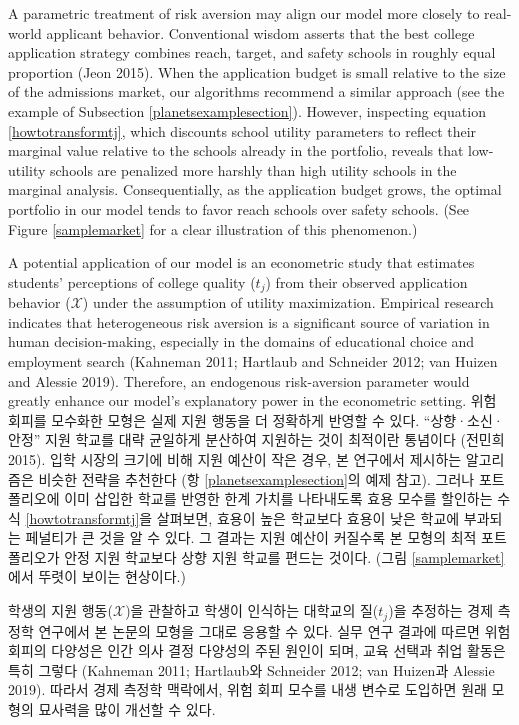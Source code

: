 \documentclass[11pt]{article} %
\theoremstyle{definition}
\theoremstyle{definition}
\begin{document}
\ifen
A parametric treatment of risk aversion may align our model more closely to real-world applicant behavior. Conventional wisdom asserts that the best college application strategy combines reach, target, and safety schools in roughly equal proportion (Jeon 2015). When the application budget is small relative to the size of the admissions market, our algorithms recommend a similar approach (see the example of Subsection \ref{planetsexamplesection}). However, inspecting equation \eqref{howtotransformtj}, which discounts school utility parameters to reflect their marginal value relative to the schools already in the portfolio, reveals that low-utility schools are penalized more harshly than high utility schools in the marginal analysis. Consequentially, as the application budget grows, the optimal portfolio in our model tends to favor reach schools over safety schools. (See Figure \ref{samplemarket} for a clear illustration of this phenomenon.) 
 
A potential application of our model is an econometric study that estimates students’ perceptions of college quality ($t_j$) from their observed application behavior ($\mathcal{X}$) under the assumption of utility maximization. Empirical research indicates that heterogeneous risk aversion is a significant source of variation in human decision-making, especially in the domains of educational choice and employment search (Kahneman 2011; Hartlaub and Schneider 2012; van Huizen and Alessie 2019). Therefore, an endogenous risk-aversion parameter would greatly enhance our model’s explanatory power in the econometric setting.
\else
위험 회피를 모수화한 모형은 실제 지원 행동을 더 정확하게 반영할 수 있다. ``상향·소신·안정'' 지원 학교를 대략 균일하게 분산하여 지원하는 것이 최적이란 통념이다 (전민희 2015). 입학 시장의 크기에 비해 지원 예산이 작은 경우, 본 연구에서 제시하는 알고리즘은 비슷한 전략을 추천한다 (항 \ref{planetsexamplesection}의 예제 참고). 그러나 포트폴리오에 이미 삽입한 학교를 반영한 한계 가치를 나타내도록 효용 모수를 할인하는 수식 \eqref{howtotransformtj}을 살펴보면, 효용이 높은 학교보다 효용이 낮은 학교에 부과되는 페널티가 큰 것을 알 수 있다. 그 결과는 지원 예산이 커질수록 본 모형의 최적 포트폴리오가 안정 지원 학교보다 상향 지원 학교를 편드는 것이다. (그림 \ref{samplemarket}에서 뚜렷이 보이는 현상이다.)

학생의 지원 행동($\mathcal{X}$)을 관찰하고 학생이 인식하는 대학교의 질($t_j$)을 추정하는 경제 측정학 연구에서 본 논문의 모형을 그대로 응용할 수 있다. 실무 연구 결과에 따르면 위험 회피의 다양성은 인간 의사 결정 다양성의 주된 원인이 되며, 교육 선택과 취업 활동은 특히 그렇다 (Kahneman 2011; Hartlaub와 Schneider 2012; van Huizen과 Alessie 2019). 따라서 경제 측정학 맥락에서, 위험 회피 모수를 내생 변수로 도입하면 원래 모형의 묘사력을 많이 개선할 수 있다.
\fi
\end{document}
